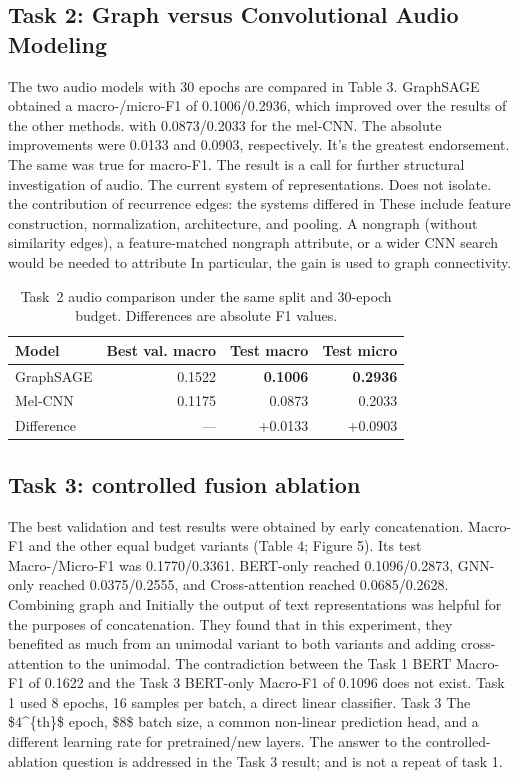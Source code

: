 \documentclass[10pt,twocolumn,letterpaper]{article}
\begin{document}
\subsection{Task 2: Graph versus Convolutional Audio Modeling}
The two audio models with 30 epochs are compared in Table 3. GraphSAGE obtained a macro-/micro-F1 of 0.1006/0.2936, which improved over the results of the other methods. with 0.0873/0.2033 for the mel-CNN. The absolute improvements were 0.0133 and 0.0903, respectively. It's the greatest endorsement. The same was true for macro-F1. The result is a call for further structural investigation of audio. The current system of representations. Does not isolate. the contribution of recurrence edges: the systems differed in These include feature construction, normalization, architecture, and pooling. A nongraph (without similarity edges), a feature-matched nongraph attribute, or a wider CNN search would be needed to attribute In particular, the gain is used to graph connectivity.

\begin{table}[t]
\centering\small
\caption{Task~2 audio comparison under the same split and 30-epoch budget. Differences are absolute F1 values.}
\label{tab:audio}
\begin{tabular}{@{}lrrr@{}}
\toprule
Model & Best val. macro & Test macro & Test micro\\
\midrule
GraphSAGE & 0.1522 & \textbf{0.1006} & \textbf{0.2936}\\
Mel-CNN & 0.1175 & 0.0873 & 0.2033\\
Difference & --- & +0.0133 & +0.0903\\
\bottomrule
\end{tabular}
\end{table}

\subsection{Task 3: controlled fusion ablation}
The best validation and test results were obtained by early concatenation. Macro-F1 and the other equal budget variants (Table 4; Figure 5). Its test Macro-/Micro-F1 was 0.1770/0.3361. BERT-only reached 0.1096/0.2873, GNN-only reached 0.0375/0.2555, and Cross-attention reached 0.0685/0.2628. Combining graph and Initially the output of text representations was helpful for the purposes of concatenation. They found that in this experiment, they benefited as much from an unimodal variant to both variants and adding cross-attention to the unimodal. The contradiction between the Task 1 BERT Macro-F1 of 0.1622 and the Task 3 BERT-only Macro-F1 of 0.1096 does not exist. Task 1 used 8 epochs, 16 samples per batch, a direct linear classifier. Task 3 The \$4\textasciicircum{}\{th\}\$ epoch, \$8\$ batch size, a common non-linear prediction head, and a different learning rate for pretrained/new layers. The answer to the controlled-ablation question is addressed in the Task 3 result; and is not a repeat of task 1.
\end{document}

